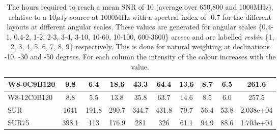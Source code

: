 \begin{table}[!htp]
{{\begin{tabular}{|l|ccccccccc|}
W8-0C9B120 & 9.8 \cellcolor{blue!18.02} & 6.4 \cellcolor{red!18.20} & 18.6 \cellcolor{green!18.73} & 43.3 \cellcolor{orange!19.02} & 64.4 \cellcolor{purple!19.01} & 13.6 \cellcolor{blue!19.00} & 8.7 \cellcolor{red!18.66} & 6.5 \cellcolor{green!18.52} & 261.6 \cellcolor{orange!18.02}\\ \hline 
W8-12C0B120 & 8.8 \cellcolor{blue!18.00} & 5.5 \cellcolor{red!18.00} & 13.8 \cellcolor{green!18.00} & 35.8 \cellcolor{orange!18.00} & 63.7 \cellcolor{purple!18.94} & 14.6 \cellcolor{blue!19.58} & 8.5 \cellcolor{red!18.57} & 6.0 \cellcolor{green!18.27} & 257.5 \cellcolor{orange!18.01}\\ \hline 
SUR & 1641 \cellcolor{blue!60.00} & 191.8 \cellcolor{red!60.00} & 290.7 \cellcolor{green!60.00} & 344.7 \cellcolor{orange!60.00} & 431.8 \cellcolor{purple!60.00} & 79.7 \cellcolor{blue!60.00} & 56.4 \cellcolor{red!41.54} & 53.8 \cellcolor{green!42.41} & 2.038e+04 \cellcolor{orange!60.00}\\ \hline 
SUR75 & 398.1 \cellcolor{blue!28.02} & 113 \cellcolor{red!42.23} & 176.9 \cellcolor{green!42.74} & 281 \cellcolor{orange!51.34} & 326 \cellcolor{purple!48.20} & 61.1 \cellcolor{blue!48.47} & 94.9 \cellcolor{red!60.00} & 88.6 \cellcolor{green!60.00} & 1.703e+04 \cellcolor{orange!53.01}\tabularnewline \hline 
\end{tabular}}\hfill \\

\caption{The hours required to reach a mean SNR of 10 (average over 650,800 and 1000MHz), relative to a 10$\mu$Jy source at 1000MHz with a spectral index of -0.7 for the different layouts at different angular scales. These values are generated for angular scales \{0.4-1, 0.4-2, 1-2, 2-3, 3-4, 3-10, 10-60, 10-100, 600-3600\} arcsec and are labelled {\it resbin} \{1, 2, 3, 4, 5, 6, 7, 8, 9\} respectively. This is done for natural weighting at declinations -10, -30 and -50 degrees. For each column the intensity of the colour increases with the value.}\label{tab:hours-new}}
 \end{table}